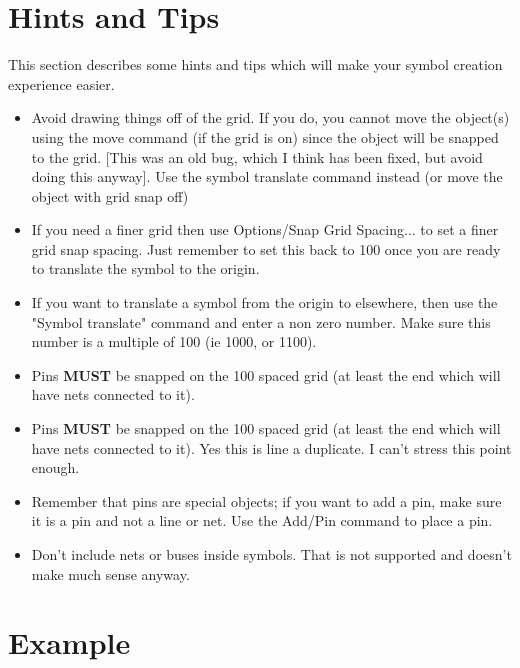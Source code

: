 \documentclass{article}
\begin{document}
\section{Hints and Tips}

This section describes some hints and tips which will make your symbol
creation experience easier.

\begin{itemize}

\item Avoid drawing things off of the grid.  If you do, you cannot move
      the object(s) using the move command (if the grid is on) since the
      object will be snapped to the grid. [This was an old bug, which I
      think has been fixed, but avoid doing this anyway].  Use the symbol
      translate command instead (or move the object with grid snap off)

\item If you need a finer grid then use Options/Snap Grid Spacing...
      to set a finer grid snap spacing.  Just remember to set this back
      to 100 once you are ready to translate the symbol to the origin.

\item If you want to translate a symbol from the origin to elsewhere,
      then use the "Symbol translate" command and enter a non zero number.
      Make sure this number is a multiple of 100 (ie 1000, or 1100).

\item Pins {\bf MUST} be snapped on the 100 spaced grid (at least the end
      which will have nets connected to it).

\item Pins {\bf MUST} be snapped on the 100 spaced grid (at least
      the end which will have nets connected to it).  Yes this is line
      a duplicate.  I can't stress this point enough.

\item Remember that pins are special objects; if you want to add
      a pin, make sure it is a pin and not a line or net.  Use the
      Add/Pin command to place a pin.

\item Don't include nets or buses inside symbols.  That is not supported
      and doesn't make much sense anyway.
\end{itemize}

\section{Example}
\end{document}
